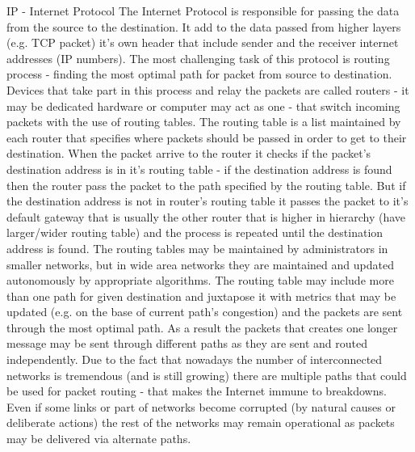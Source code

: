 \documentclass[magisterska,en]{pracamgr}
\begin{document}
IP - Internet Protocol
The Internet Protocol is responsible for passing the data from the source to the destination. It add to the data passed from higher layers (e.g. TCP packet) it's own header that include sender and the receiver internet addresses (IP numbers). The most challenging task of this protocol is routing process - finding the most optimal path for packet from source to destination. Devices that take part in this process and relay the packets are called routers - it may be dedicated hardware or computer may act as one - that switch incoming packets with the use of routing tables. The routing table is a list maintained by each router that specifies where packets should be passed in order to get to their destination. When the packet arrive to the router it checks if the packet's destination address is in it's routing table - if the destination address is found then the router pass the packet to the path specified by the routing table. But if the destination address is not in router's routing table it passes the packet to it's default gateway that is usually the other router that is higher in hierarchy (have larger/wider routing table) and the process is repeated until the destination address is found. \cite{how_internet_work} The routing tables may be maintained by administrators in smaller networks, but in wide area networks they are maintained and updated autonomously by appropriate algorithms. The routing table may include more than one path for given destination and juxtapose it with metrics that may be updated (e.g. on the base of current path's congestion) and the packets are sent through the most optimal path. As a result the packets that creates one longer message may be sent through different paths as they are sent and routed independently. Due to the fact that nowadays the number of interconnected networks is tremendous (and is still growing) there are multiple paths that could be used for packet routing - that makes the Internet immune to breakdowns. Even if some links or part of networks become corrupted (by natural causes or deliberate actions) the rest of the networks may remain operational as packets may be delivered via alternate paths.
\end{document}
